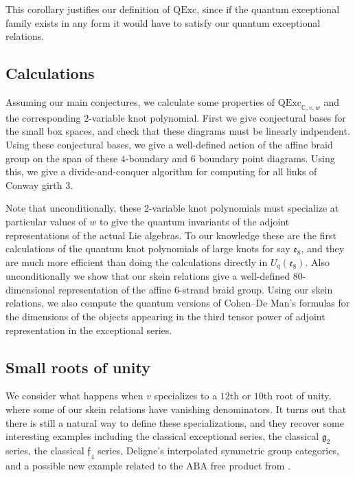 \documentclass[12pt]{amsart}
\begin{document}
This corollary justifies our definition of $\mathrm{QExc}$, since if the quantum exceptional family exists in any form it would have to satisfy our quantum exceptional relations.


\subsection{Calculations}


Assuming our main conjectures, we calculate some properties of $\mathrm{QExc}_{\mathbb{C},v,w}$ and the corresponding $2$-variable knot polynomial.  First we give conjectural bases for the small box spaces, and check that these diagrams must be linearly indpendent.  Using these conjectural bases, we give a well-defined action of the affine braid group on the span of these $4$-boundary and $6$ boundary point diagrams.  Using this, we give a divide-and-conquer algorithm for computing for all links of Conway girth 3.



Note that unconditionally, these 2-variable knot polynomials must specialize
at particular values of $w$ to give the quantum invariants of the adjoint
representations of the actual Lie algebras.  To our knowledge these are the
first calculations of the quantum knot polynomials of large knots for say
$\mathfrak{e}_8$, and they are much more efficient than doing the calculations
directly in $U_q(\mathfrak{e}_8)$.  Also unconditionally we show that our
skein relations give a well-defined $80$-dimensional representation of the
affine $6$-strand braid group.  Using our skein relations, we also compute the
quantum versions of Cohen--De Man's formulas for the dimensions of the objects
appearing in the third tensor power of adjoint representation in the
exceptional series.

\subsection{Small roots of unity}


We consider what happens when $v$ specializes to a $12$th or $10$th
root of unity, where some of our skein relations have vanishing denominators.
It turns out that there is still a natural way to define these
specializations, and they recover some interesting examples including the
classical exceptional series, the classical $\mathfrak{g}_2$ series, the
classical $\mathfrak{f}_4$ series, Deligne's interpolated symmetric group
categories, and a possible new example related to the ABA free product from
\cite{???}.
\end{document}
